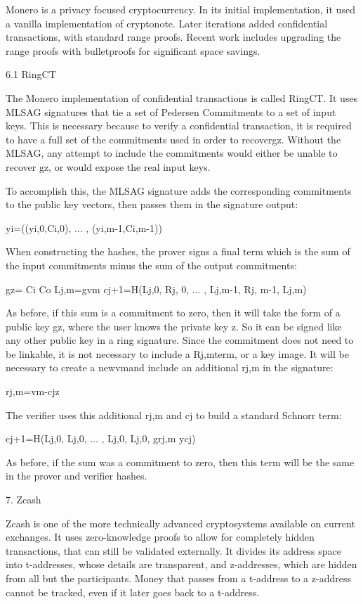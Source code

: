 \documentclass{article}
\begin{document}
Monero is a privacy focused cryptocurrency.  In its initial implementation, it used a vanilla implementation of cryptonote.  Later iterations added confidential transactions, with standard range proofs.  Recent work includes upgrading the range proofs with bulletproofs for significant space savings.


6.1 RingCT

The Monero implementation of confidential transactions is called RingCT.  It uses MLSAG signatures that tie a set of Pedersen Commitments to a set of input keys.  This is necessary because to verify a confidential transaction, it is required to have a full set of the commitments used in order to recovergz.  Without the MLSAG, any attempt to include the commitments would either be unable to recover gz, or would expose the real input keys.

To accomplish this, the MLSAG signature adds the corresponding commitments to the public key vectors, then passes them in the signature output:

	yi=((yi,0,Ci,0), ... , (yi,m-1,Ci,m-1))

When constructing the hashes, the prover signs a final term which is the sum of the input commitments minus the sum of the output commitments:

	gz= Ci Co
	Lj,m=gvm
	cj+1=H(Lj,0, Rj, 0, ... , Lj,m-1, Rj, m-1, Lj,m)

As before, if this sum is a commitment to zero, then it will take the form of a public key gz, where the user knows the private key z.  So it can be signed like any other public key in a ring signature.  Since the commitment does not need to be linkable, it is not necessary to include a Rj,mterm, or a key image.  It will be necessary to create a newvmand include an additional rj,m in the signature:

	rj,m=vm-cjz

The verifier uses this additional rj,m and cj to build a standard Schnorr term:

	cj+1=H(Lj,0, Lj,0, ... , Lj,0, Lj,0, grj,m ycj)

As before, if the sum was a commitment to zero, then this term will be the same in the prover and verifier hashes.



7. Zcash

Zcash is one of the more technically advanced cryptosystems available on current exchanges.  It uses zero-knowledge proofs to allow for completely hidden transactions, that can still be validated externally.  It divides its address space into t-addresses, whose details are transparent, and z-addresses, which are hidden from all but the participants.  Money that passes from a t-address to a z-address cannot be tracked, even if it later goes back to a t-address.
\end{document}

